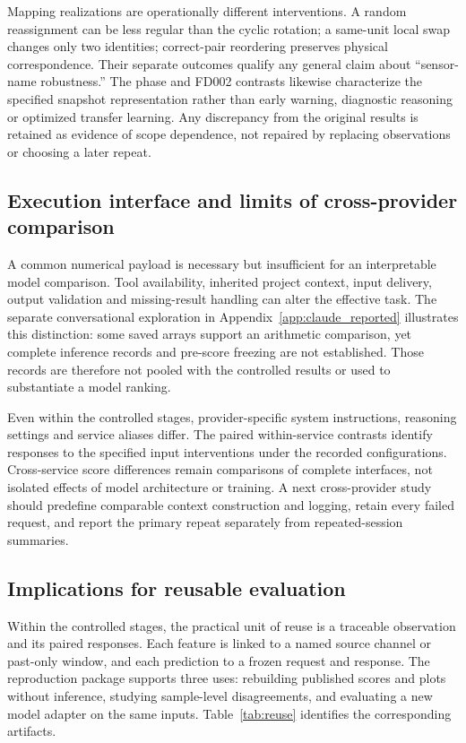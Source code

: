 \documentclass[11pt,a4paper]{article}
\begin{document}
Mapping realizations are operationally different interventions. A random reassignment can be less regular than the cyclic rotation; a same-unit local swap changes only two identities; correct-pair reordering preserves physical correspondence. Their separate outcomes qualify any general claim about ``sensor-name robustness.'' The phase and FD002 contrasts likewise characterize the specified snapshot representation rather than early warning, diagnostic reasoning or optimized transfer learning. Any discrepancy from the original results is retained as evidence of scope dependence, not repaired by replacing observations or choosing a later repeat.

\subsection{Execution interface and limits of cross-provider comparison}
A common numerical payload is necessary but insufficient for an interpretable model comparison. Tool availability, inherited project context, input delivery, output validation and missing-result handling can alter the effective task. The separate conversational exploration in Appendix~\ref{app:claude_reported} illustrates this distinction: some saved arrays support an arithmetic comparison, yet complete inference records and pre-score freezing are not established. Those records are therefore not pooled with the controlled results or used to substantiate a model ranking.

Even within the controlled stages, provider-specific system instructions, reasoning settings and service aliases differ. The paired within-service contrasts identify responses to the specified input interventions under the recorded configurations. Cross-service score differences remain comparisons of complete interfaces, not isolated effects of model architecture or training. A next cross-provider study should predefine comparable context construction and logging, retain every failed request, and report the primary repeat separately from repeated-session summaries.

\subsection{Implications for reusable evaluation}
Within the controlled stages, the practical unit of reuse is a traceable observation and its paired responses. Each feature is linked to a named source channel or past-only window, and each prediction to a frozen request and response. The reproduction package supports three uses: rebuilding published scores and plots without inference, studying sample-level disagreements, and evaluating a new model adapter on the same inputs. Table~\ref{tab:reuse} identifies the corresponding artifacts.
\end{document}

